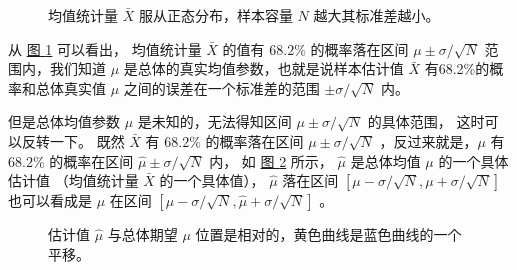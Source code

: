 \documentclass[letterpaper,10pt,english]{sphinxmanual}
\begin{document}
\begin{figure}[htbp]
\centering
\capstart

\noindent{}
\caption{均值统计量 \(\bar{X}\) 服从正态分布，样本容量 \(N\) 越大其标准差越小。}\label{\detokenize{_u63a8_u65ad_u4e0e_u68c0_u9a8c/content:id25}}\label{\detokenize{_u63a8_u65ad_u4e0e_u68c0_u9a8c/content:pic-influence}}\end{figure}

从 \hyperref[\detokenize{_u63a8_u65ad_u4e0e_u68c0_u9a8c/content:pic-influence}]{图 \ref{\detokenize{_u63a8_u65ad_u4e0e_u68c0_u9a8c/content:pic-influence}}} 可以看出，
均值统计量 \(\bar{X}\) 的值有 \(68.2\%\) 的概率落在区间 \(\mu \pm \sigma/\sqrt{N}\)
范围内，我们知道 \(\mu\) 是总体的真实均值参数，也就是说样本估计值 \(\bar{X}\)
有68.2\%的概率和总体真实值 \(\mu\) 之间的误差在一个标准差的范围  \(\pm \sigma/\sqrt{N}\) 内。

但是总体均值参数 \(\mu\) 是未知的，无法得知区间 \(\mu \pm \sigma/\sqrt{N}\) 的具体范围，
这时可以反转一下。
既然 \(\bar{X}\) 有 \(68.2\%\) 的概率落在区间 \(\mu \pm \sigma/\sqrt{N}\)
，反过来就是，\(\mu\) 有 \(68.2\%\) 的概率在区间 \(\hat{\mu} \pm \sigma/\sqrt{N}\) 内，
如 \hyperref[\detokenize{_u63a8_u65ad_u4e0e_u68c0_u9a8c/content:fg-influence}]{图 \ref{\detokenize{_u63a8_u65ad_u4e0e_u68c0_u9a8c/content:fg-influence}}} 所示，
\(\hat{\mu}\) 是总体均值 \(\mu\) 的一个具体估计值
（均值统计量 \(\bar{X}\) 的一个具体值），
\(\hat{\mu}\) 落在区间
\([\mu-\sigma/\sqrt{N},\mu+\sigma/\sqrt{N}]\)
也可以看成是 \(\mu\) 在区间
\([\hat{\mu}-\sigma/\sqrt{N},\hat{\mu}+\sigma/\sqrt{N}]\)
。

\begin{figure}[htbp]
\centering
\capstart

\noindent{}
\caption{估计值 \(\hat{\mu}\) 与总体期望 \(\mu\) 位置是相对的，黄色曲线是蓝色曲线的一个平移。}\label{\detokenize{_u63a8_u65ad_u4e0e_u68c0_u9a8c/content:id26}}\label{\detokenize{_u63a8_u65ad_u4e0e_u68c0_u9a8c/content:fg-influence}}\end{figure}
\end{document}
